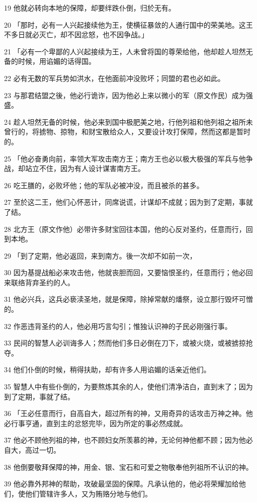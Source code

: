 \par 19 他就必转向本地的保障，却要绊跌仆倒，归於无有。
\par 20 「那时，必有一人兴起接续他为王，使横征暴敛的人通行国中的荣美地。这王不多日就必灭亡，却不因忿怒，也不因争战。」
\par 21 「必有一个卑鄙的人兴起接续为王，人未曾将国的尊荣给他，他却趁人坦然无备的时候，用谄媚的话得国。
\par 22 必有无数的军兵势如洪水，在他面前冲没败坏；同盟的君也必如此。
\par 23 与那君结盟之後，他必行诡诈，因为他必上来以微小的军（原文作民）成为强盛。
\par 24 趁人坦然无备的时候，他必来到国中极肥美之地，行他列祖和他列祖之祖所未曾行的，将掳物、掠物，和财宝散给众人，又要设计攻打保障，然而这都是暂时的。
\par 25 「他必奋勇向前，率领大军攻击南方王；南方王也必以极大极强的军兵与他争战，却站立不住，因为有人设计谋害南方王。
\par 26 吃王膳的，必败坏他；他的军队必被冲没，而且被杀的甚多。
\par 27 至於这二王，他们心怀恶计，同席说谎，计谋却不成就；因为到了定期，事就了结。
\par 28 北方王（原文作他）必带许多财宝回往本国，他的心反对圣约，任意而行，回到本地。
\par 29 「到了定期，他必返回，来到南方。後一次却不如前一次，
\par 30 因为基提战船必来攻击他，他就丧胆而回，又要恼恨圣约，任意而行；他必回来联络背弃圣约的人。
\par 31 他必兴兵，这兵必亵渎圣地，就是保障，除掉常献的燔祭，设立那行毁坏可憎的。
\par 32 作恶违背圣约的人，他必用巧言勾引；惟独认识神的子民必刚强行事。
\par 33 民间的智慧人必训诲多人；然而他们多日必倒在刀下，或被火烧，或被掳掠抢夺。
\par 34 他们仆倒的时候，稍得扶助，却有许多人用谄媚的话亲近他们。
\par 35 智慧人中有些仆倒的，为要熬炼其余的人，使他们清净洁白，直到末了；因为到了定期，事就了结。
\par 36 「王必任意而行，自高自大，超过所有的神，又用奇异的话攻击万神之神。他必行事亨通，直到主的忿怒完毕，因为所定的事必然成就。
\par 37 他必不顾他列祖的神，也不顾妇女所羡慕的神，无论何神他都不顾；因为他必自大，高过一切。
\par 38 他倒要敬拜保障的神，用金、银、宝石和可爱之物敬奉他列祖所不认识的神。
\par 39 他必靠外邦神的帮助，攻破最坚固的保障。凡承认他的，他必将荣耀加给他们，使他们管辖许多人，又为贿赂分地与他们。
